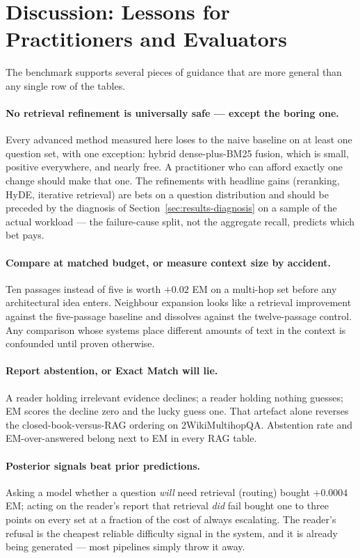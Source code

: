 \section{Discussion: Lessons for Practitioners and Evaluators}
\label{sec:discussion}

The benchmark supports several pieces of guidance that are more general
than any single row of the tables.

\paragraph{No retrieval refinement is universally safe --- except the
boring one.} Every advanced method measured here loses to the naive
baseline on at least one question set, with one exception: hybrid
dense-plus-BM25 fusion, which is small, positive everywhere, and nearly
free. A practitioner who can afford exactly one change should make that
one. The refinements with headline gains (reranking, HyDE, iterative
retrieval) are bets on a question distribution and should be preceded by
the diagnosis of Section~\ref{sec:results-diagnosis} on a sample of the
actual workload --- the failure-cause split, not the aggregate recall,
predicts which bet pays.

\paragraph{Compare at matched budget, or measure context size by
accident.} Ten passages instead of five is worth $+0.02$ EM on a multi-hop
set before any architectural idea enters. Neighbour expansion looks like a
retrieval improvement against the five-passage baseline and dissolves
against the twelve-passage control. Any comparison whose systems place
different amounts of text in the context is confounded until proven
otherwise.

\paragraph{Report abstention, or Exact Match will lie.} A reader holding
irrelevant evidence declines; a reader holding nothing guesses; EM scores
the decline zero and the lucky guess one. That artefact alone reverses the
closed-book-versus-RAG ordering on 2WikiMultihopQA. Abstention rate and
EM-over-answered belong next to EM in every RAG table.

\paragraph{Posterior signals beat prior predictions.} Asking a model
whether a question \emph{will} need retrieval (routing) bought $+0.0004$
EM; acting on the reader's report that retrieval \emph{did} fail bought
one to three points on every set at a fraction of the cost of always
escalating. The reader's refusal is the cheapest reliable difficulty
signal in the system, and it is already being generated --- most
pipelines simply throw it away.

